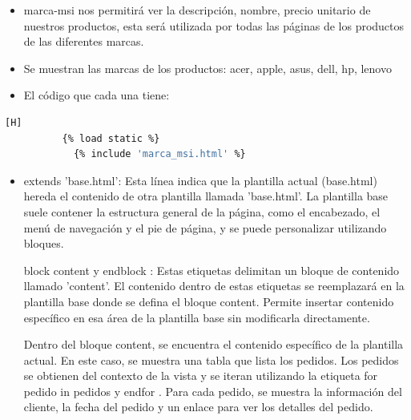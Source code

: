 \documentclass{article}
\begin{document}
\begin{itemize}
\begin{itemize}
            \begin{itemize}
                    \item  marca-msi nos permitirá ver la descripción, nombre, precio unitario de nuestros productos, esta será utilizada por todas las páginas de los productos de las diferentes marcas.
            \end{itemize}
            
            \begin{itemize}
                \item Se muestran las marcas de los productos: acer, apple, asus, dell, hp, lenovo 
                \item El código que cada una tiene:   
            \end{itemize}
            \begin{lstlisting}[language=bash,caption={Código de las marcas}][H]
		  {% load static %}
            {% include 'marca_msi.html' %}
	       \end{lstlisting}

            
            \begin{itemize}
                    \item {extends 'base.html'}: Esta línea indica que la plantilla actual (base.html) hereda el contenido de otra plantilla llamada 'base.html'. La plantilla base suele contener la estructura general de la página, como el encabezado, el menú de navegación y el pie de página, y se puede personalizar utilizando bloques.

                    { block content } y { endblock }: Estas etiquetas delimitan un bloque de contenido llamado 'content'. El contenido dentro de estas etiquetas se reemplazará en la plantilla base donde se defina el bloque content. Permite insertar contenido específico en esa área de la plantilla base sin modificarla directamente.

                    Dentro del bloque content, se encuentra el contenido específico de la plantilla actual. En este caso, se muestra una tabla que lista los pedidos. Los pedidos se obtienen del contexto de la vista y se iteran utilizando la etiqueta { for pedido in pedidos } y { endfor }. Para cada pedido, se muestra la información del cliente, la fecha del pedido y un enlace para ver los detalles del pedido.


\end{itemize}
\end{itemize}
\end{itemize}
\end{document}
